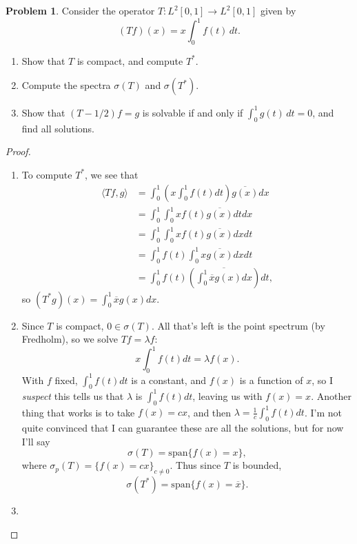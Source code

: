 \documentclass[12pt]{article}
\theoremstyle{definition}
\newtheorem{ex}{Problem}
\begin{document}
\begin{ex}
	Consider the operator $T : L^2[0, 1] \to L^2[0, 1]$ given by \begin{equation*}
		(Tf)(x) = x\int_0^1 f(t) \, dt.
	\end{equation*}
	\begin{enumerate}[label=(\alph*)]
		\item Show that $T$ is compact, and compute $T^*$.
		\item Compute the spectra $\sigma(T)$ and $\sigma(T^*)$.
		\item Show that $(T - 1/2)f = g$ is solvable if and only if $\int_0^1 g(t) \, dt = 0$, and find all solutions.
	\end{enumerate}
\end{ex}
\begin{proof}\
	\begin{enumerate}[label=(\alph*)]
		\item To compute $T^*$, we see that \begin{align*}
        \langle Tf, g \rangle & = \int_0^1 \left(x\int_0^1 f(t) dt\right)\overline{g(x)}dx \\
        & = \int_0^1\int_0^1xf(t)\overline{g(x)}dtdx \\
        & = \int_0^1\int_0^1xf(t)\overline{g(x)}dxdt \\
        & = \int_0^1f(t)\int_0^1x\overline{g(x)}dxdt \\
        & = \int_0^1f(t)\left(\overline{\int_0^1\overline{x}g(x)dx}\right)dt,
    \end{align*}
      so $(T^*g)(x) = \int_0^1\overline{x}g(x)dx$.
    \item Since $T$ is compact, $0 \in \sigma(T)$.
      All that's left is the point spectrum (by Fredholm), so we solve $Tf = \lambda f$: \begin{equation*}
        x\int_0^1f(t)dt = \lambda f(x).
      \end{equation*}
      With $f$ fixed, $\int_0^1 f(t)dt$ is a constant, and $f(x)$ is a function of $x$, so I \textit{suspect} this tells us that $\lambda$ is $\int_0^1 f(t)dt$, leaving us with $f(x) = x$.
      Another thing that works is to take $f(x) = cx$, and then $\lambda = \frac{1}{c}\int_0^1 f(t)dt$.
      I'm not quite convinced that I can guarantee these are all the solutions, but for now I'll say \begin{equation*}
        \sigma(T) = \mathrm{span} \lbrace f(x) = x \rbrace,
      \end{equation*}
      where $\sigma_p(T) = \lbrace f(x) = cx \rbrace_{c \neq 0}$.
      Thus since $T$ is bounded, \begin{equation*}
        \sigma(T^*) = \mathrm{span} \lbrace f(x) = \overline{x} \rbrace.
      \end{equation*}
		\item
	\end{enumerate}
\end{proof}
\end{document}

